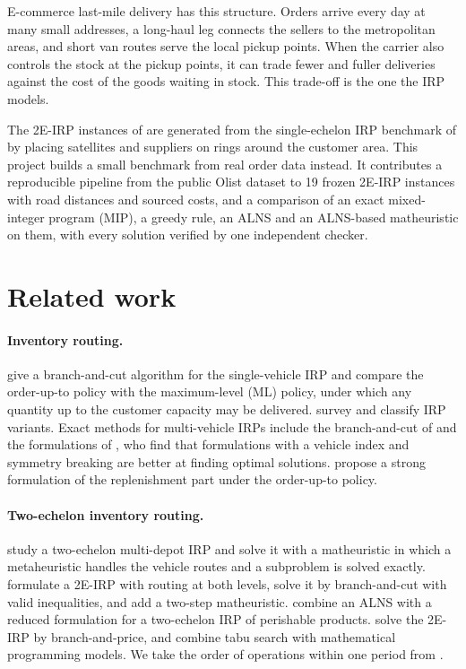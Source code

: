 \documentclass[11pt,a4paper]{article}
\begin{document}
E-commerce last-mile delivery has this structure. Orders arrive every day at many small addresses,
a long-haul leg connects the sellers to the metropolitan areas, and short van routes serve the
local pickup points. When the carrier also controls the stock at the pickup points, it can trade
fewer and fuller deliveries against the cost of the goods waiting in stock. This trade-off is the
one the IRP models.

The 2E-IRP instances of \citet{charaf2024branch} are generated from the single-echelon IRP
benchmark of \citet{archetti2007branch} by placing satellites and suppliers on rings around the
customer area. This project builds a small benchmark from real order data instead. It
contributes a reproducible pipeline from the public Olist dataset \citep{olist2021dataset} to 19
frozen 2E-IRP instances with road distances and sourced costs, and a comparison of an exact mixed-integer program (MIP), a greedy rule, an ALNS and an
ALNS-based matheuristic on them, with every solution verified by one independent checker.

\section{Related work}\label{sec:related}

\paragraph{Inventory routing.}
\citet{archetti2007branch} give a branch-and-cut algorithm for the single-vehicle IRP and compare
the order-up-to policy with the maximum-level (ML) policy, under which any quantity up to the
customer capacity may be delivered. \citet{coelho2014thirty} survey and classify IRP variants. Exact methods for
multi-vehicle IRPs include the branch-and-cut of \citet{coelho2013exact} and the formulations of
\citet{adulyasak2014formulations}, who find that formulations with a vehicle index and symmetry
breaking are better at finding optimal solutions. \citet{solyali2011branch}
propose a strong formulation of the replenishment part under the order-up-to policy.

\paragraph{Two-echelon inventory routing.}
\citet{guimaraes2019two} study a two-echelon multi-depot IRP and solve it with a matheuristic in
which a metaheuristic handles the vehicle routes and a subproblem is solved exactly.
\citet{farias2021model} formulate a 2E-IRP with routing at both levels, solve it by branch-and-cut
with valid inequalities, and add a two-step matheuristic. \citet{rohmer2019two} combine an ALNS with
a reduced formulation for a two-echelon IRP of perishable products. \citet{charaf2024branch} solve
the 2E-IRP by branch-and-price, and \citet{charaf2024matheuristic} combine tabu search with
mathematical programming models. We take the order of operations within one period from
\citet{charaf2024branch}.
\end{document}
